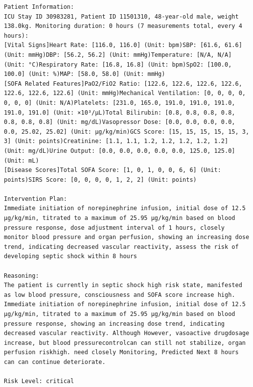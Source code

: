 \documentclass{article}
\begin{document}
\begin{lstlisting}[caption={Result for Patient 30983281}, label={lst:30983281}]
Patient Information:
ICU Stay ID 30983281, Patient ID 11501310, 48-year-old male, weight 138.0kg. Monitoring duration: 0 hours (7 measurements total, every 4 hours):
[Vital Signs]Heart Rate: [116.0, 116.0] (Unit: bpm)SBP: [61.6, 61.6] (Unit: mmHg)DBP: [56.2, 56.2] (Unit: mmHg)Temperature: [N/A, N/A] (Unit: °C)Respiratory Rate: [16.8, 16.8] (Unit: bpm)SpO2: [100.0, 100.0] (Unit: %)MAP: [58.0, 58.0] (Unit: mmHg)
[SOFA Related Features]PaO2/FiO2 Ratio: [122.6, 122.6, 122.6, 122.6, 122.6, 122.6, 122.6] (Unit: mmHg)Mechanical Ventilation: [0, 0, 0, 0, 0, 0, 0] (Unit: N/A)Platelets: [231.0, 165.0, 191.0, 191.0, 191.0, 191.0, 191.0] (Unit: ×10³/μL)Total Bilirubin: [0.8, 0.8, 0.8, 0.8, 0.8, 0.8, 0.8] (Unit: mg/dL)Vasopressor Dose: [0.0, 0.0, 0.0, 0.0, 0.0, 25.02, 25.02] (Unit: μg/kg/min)GCS Score: [15, 15, 15, 15, 15, 3, 3] (Unit: points)Creatinine: [1.1, 1.1, 1.2, 1.2, 1.2, 1.2, 1.2] (Unit: mg/dL)Urine Output: [0.0, 0.0, 0.0, 0.0, 0.0, 125.0, 125.0] (Unit: mL)
[Disease Scores]Total SOFA Score: [1, 0, 1, 0, 0, 6, 6] (Unit: points)SIRS Score: [0, 0, 0, 0, 1, 2, 2] (Unit: points)

Intervention Plan:
Immediate initiation of norepinephrine infusion, initial dose of 12.5 μg/kg/min, titrated to a maximum of 25.95 μg/kg/min based on blood pressure response, dose adjustment interval of 1 hours, closely monitor blood pressure and organ perfusion, showing an increasing dose trend, indicating decreased vascular reactivity, assess the risk of developing septic shock within 8 hours

Reasoning:
The patient is currently in septic shock high risk state, manifested as low blood pressure, consciousness and SOFA score increase high. Immediate initiation of norepinephrine infusion, initial dose of 12.5 μg/kg/min, titrated to a maximum of 25.95 μg/kg/min based on blood pressure response, showing an increasing dose trend, indicating decreased vascular reactivity. Although However, vasoactive drugdosage increase, but blood pressurecontrolcan can still not stabilize, organ perfusion riskhigh. need closely Monitoring, Predicted Next 8 hours can can continue deteriorate.

Risk Level: critical
\end{lstlisting}
\end{document}
